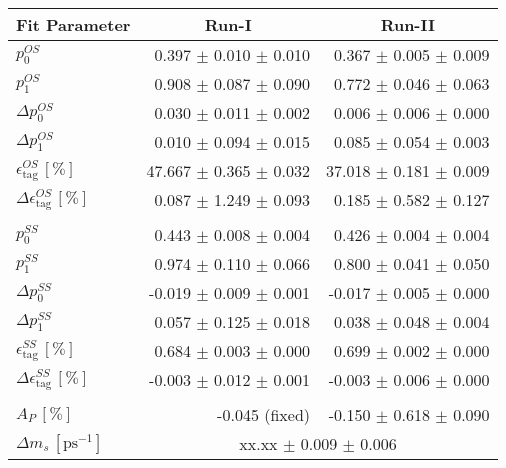 \begin{tabular}{l r r } 
\hline
\hline
\multicolumn{1}{c}{Fit Parameter} & \multicolumn{1}{c}{Run-I} & \multicolumn{1}{c}{Run-II}  \\ 
\hline
$p_{0}^{OS}$ & 0.397 $\pm$ 0.010 $\pm$ 0.010 & 0.367 $\pm$ 0.005 $\pm$ 0.009 \\ 
$p_{1}^{OS}$ & 0.908 $\pm$ 0.087 $\pm$ 0.090 & 0.772 $\pm$ 0.046 $\pm$ 0.063 \\ 
$\Delta p_{0}^{OS}$ & 0.030 $\pm$ 0.011 $\pm$ 0.002 & 0.006 $\pm$ 0.006 $\pm$ 0.000 \\ 
$\Delta p_{1}^{OS}$ & 0.010 $\pm$ 0.094 $\pm$ 0.015 & 0.085 $\pm$ 0.054 $\pm$ 0.003 \\ 
$\epsilon_{\text{tag}}^{OS} \, [\%]$ & 47.667 $\pm$ 0.365 $\pm$ 0.032 & 37.018 $\pm$ 0.181 $\pm$ 0.009 \\ 
$\Delta \epsilon_{\text{tag}}^{OS} \, [\%]$ & 0.087 $\pm$ 1.249 $\pm$ 0.093 & 0.185 $\pm$ 0.582 $\pm$ 0.127 \\ 
 \\ 
$p_{0}^{SS}$ & 0.443 $\pm$ 0.008 $\pm$ 0.004 & 0.426 $\pm$ 0.004 $\pm$ 0.004 \\ 
$p_{1}^{SS}$ & 0.974 $\pm$ 0.110 $\pm$ 0.066 & 0.800 $\pm$ 0.041 $\pm$ 0.050 \\ 
$\Delta p_{0}^{SS}$ & -0.019 $\pm$ 0.009 $\pm$ 0.001 & -0.017 $\pm$ 0.005 $\pm$ 0.000 \\ 
$\Delta p_{1}^{SS}$ & 0.057 $\pm$ 0.125 $\pm$ 0.018 & 0.038 $\pm$ 0.048 $\pm$ 0.004 \\ 
$\epsilon_{\text{tag}}^{SS} \, [\%]$ & 0.684 $\pm$ 0.003 $\pm$ 0.000 & 0.699 $\pm$ 0.002 $\pm$ 0.000 \\ 
$\Delta \epsilon_{\text{tag}}^{SS} \, [\%]$ & -0.003 $\pm$ 0.012 $\pm$ 0.001 & -0.003 $\pm$ 0.006 $\pm$ 0.000 \\ 
 \\ 
$A_{P} \, [\%]$ & -0.045 (fixed) & -0.150 $\pm$ 0.618 $\pm$ 0.090 \\ 
\hline
$\Delta m_{s} \, [\text{ps}^{-1}]$ & \multicolumn{2}{c}{ xx.xx $\pm$ 0.009 $\pm$ 0.006 }  \\ 
\hline
\hline
\end{tabular}
